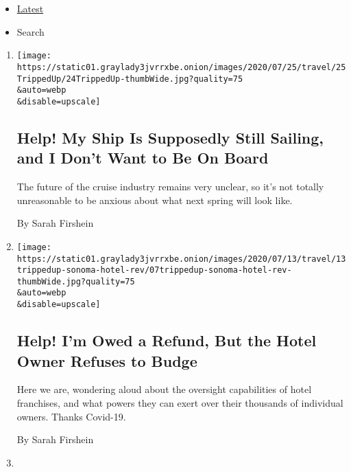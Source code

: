 \begin{itemize}
\tightlist
\item
  \protect\hyperlink{stream-panel}{Latest}
\item
  Search
\end{itemize}

\begin{enumerate}
\def\labelenumi{\arabic{enumi}.}
\item
  \href{/2020/07/22/travel/virus-cruise-refunds.html}{}

  \texttt{[image: https://static01.graylady3jvrrxbe.onion/images/2020/07/25/travel/25TrippedUp/24TrippedUp-thumbWide.jpg?quality=75\\\&auto=webp\\\&disable=upscale]}

  \hypertarget{help-my-ship-is-supposedly-still-sailing-and-i-dont-want-to-be-on-board}{%
  \subsection{Help! My Ship Is Supposedly Still Sailing, and I Don't
  Want to Be On
  Board}\label{help-my-ship-is-supposedly-still-sailing-and-i-dont-want-to-be-on-board}}

  The future of the cruise industry remains very unclear, so it's not
  totally unreasonable to be anxious about what next spring will look
  like.

  By Sarah Firshein
\item
  \href{/2020/07/07/travel/virus-refunds-hotel-franchises.html}{}

  \texttt{[image: https://static01.graylady3jvrrxbe.onion/images/2020/07/13/travel/13trippedup-sonoma-hotel-rev/07trippedup-sonoma-hotel-rev-thumbWide.jpg?quality=75\\\&auto=webp\\\&disable=upscale]}

  \hypertarget{help-im-owed-a-refund-but-the-hotel-owner-refuses-to-budge}{%
  \subsection{Help! I'm Owed a Refund, But the Hotel Owner Refuses to
  Budge}\label{help-im-owed-a-refund-but-the-hotel-owner-refuses-to-budge}}

  Here we are, wondering aloud about the oversight capabilities of hotel
  franchises, and what powers they can exert over their thousands of
  individual owners. Thanks Covid-19.

  By Sarah Firshein
\item
  \href{/2020/06/18/travel/travel-refunds-airlines.html}{}


\end{enumerate}
